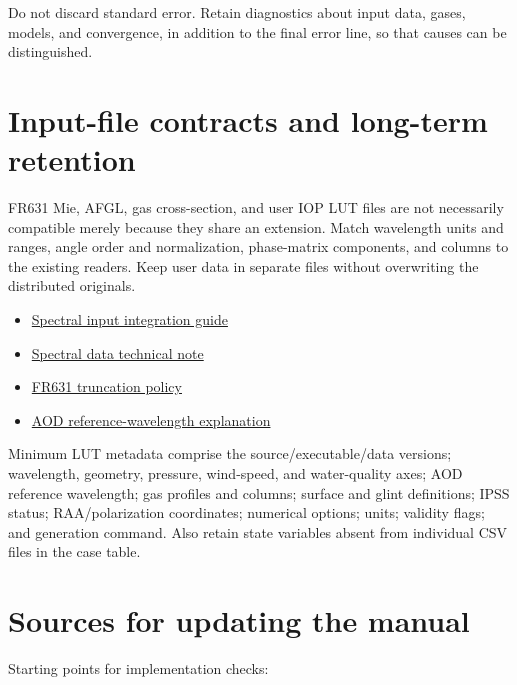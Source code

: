 Do not discard standard error. Retain diagnostics about input data, gases, models, and convergence, in addition to the final error line, so that causes can be distinguished.

\section{Input-file contracts and long-term retention}
\label{sec:auto:07_validation_notes:4}
FR631 Mie, AFGL, gas cross-section, and user IOP LUT files are not necessarily compatible merely because they share an extension. Match wavelength units and ranges, angle order and normalization, phase-matrix components, and columns to the existing readers. Keep user data in separate files without overwriting the distributed originals.

\begin{itemize}
\item \href{https://github.com/brtnt/OCRT/blob/54861c68e35ec5aaa3938fad53e93dc2dfa7eb1d/code/OCRT_C/docs/OCRT_330_1100_FR631_INTEGRATION_GUIDE_KO.md}{Spectral input integration guide}
\item \href{https://github.com/brtnt/OCRT/blob/54861c68e35ec5aaa3938fad53e93dc2dfa7eb1d/code/OCRT_C/docs/OCRT_330_1100_FR631_SPECTRAL_DATA_TECHNICAL_NOTE_KO.md}{Spectral data technical note}
\item \href{https://github.com/brtnt/OCRT/blob/54861c68e35ec5aaa3938fad53e93dc2dfa7eb1d/code/OCRT_C/docs/OCRT_MIE_GRID_TRUNCATION_AND_VALIDATION_ARTIFACT_POLICY_2026-08-21.md}{FR631 truncation policy}
\item \href{https://github.com/brtnt/OCRT/blob/54861c68e35ec5aaa3938fad53e93dc2dfa7eb1d/code/OCRT_C/docs/OCRT_AOD_REFERENCE_WAVELENGTH_KO.md}{AOD reference-wavelength explanation}
\end{itemize}

Minimum LUT metadata comprise the source/executable/data versions; wavelength, geometry, pressure, wind-speed, and water-quality axes; AOD reference wavelength; gas profiles and columns; surface and glint definitions; IPSS status; RAA/polarization coordinates; numerical options; units; validity flags; and generation command. Also retain state variables absent from individual CSV files in the case table.

\section{Sources for updating the manual}
\label{sec:auto:07_validation_notes:5}
Starting points for implementation checks:

